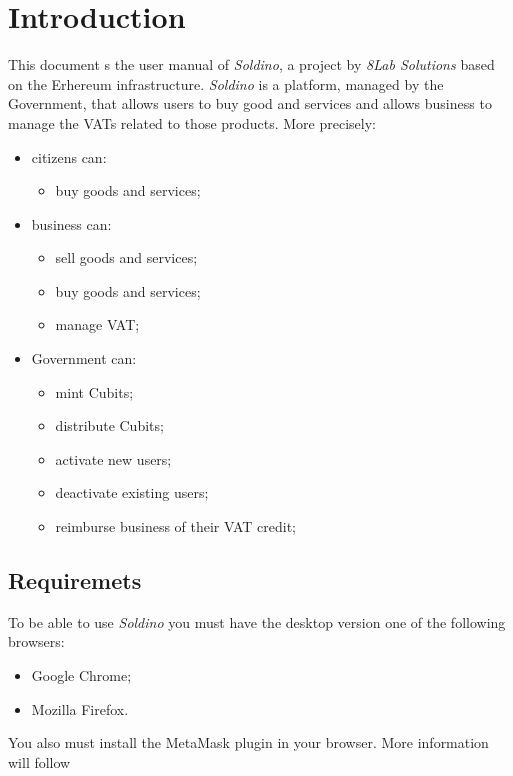 \section{Introduction} 
	This document s the user manual of \textit{Soldino}, a project by 
	\textit{8Lab Solutions} based on the Erhereum infrastructure. 
	\textit{Soldino} is a platform, managed by the Government, that allows 
	users to buy good and services and allows business to manage the VATs 
	related to those products.
	More precisely:
	\begin{itemize}
		\item citizens can:
		\begin{itemize}
			\item  buy goods and services;
		\end{itemize}
		\item business can:
		\begin{itemize}
			\item sell goods and services;
			\item buy goods and services;
			\item manage VAT;
		\end{itemize}
		\item Government can:
		\begin{itemize}
			\item mint Cubits;
			\item distribute Cubits;
			\item activate new users;
			\item deactivate existing users;
			\item reimburse business of their VAT credit;
		\end{itemize}
	\end{itemize}

\subsection{Requiremets}
	To be able to use \textit{Soldino} you must have the desktop version one 
	of the following browsers:
	\begin{itemize}
		\item Google Chrome;
		\item Mozilla Firefox.
	\end{itemize}
	You also must install the MetaMask plugin in your browser. More information 
	will follow 